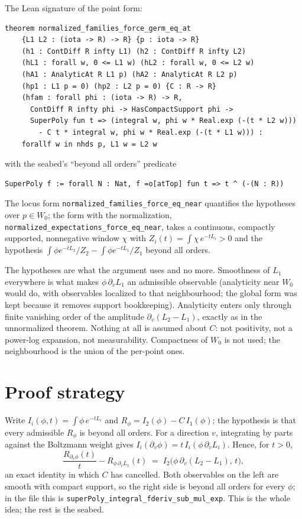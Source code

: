 \documentclass[11pt]{article}
\newcommand{\code}[1]{\texttt{#1}}
\begin{document}
\noindent The Lean signature of the point form:
\begin{verbatim}
theorem normalized_families_force_germ_eq_at
    {L1 L2 : (iota -> R) -> R} {p : iota -> R}
    (h1 : ContDiff R infty L1) (h2 : ContDiff R infty L2)
    (hL1 : forall w, 0 <= L1 w) (hL2 : forall w, 0 <= L2 w)
    (hA1 : AnalyticAt R L1 p) (hA2 : AnalyticAt R L2 p)
    (hp1 : L1 p = 0) (hp2 : L2 p = 0) {C : R -> R}
    (hfam : forall phi : (iota -> R) -> R,
      ContDiff R infty phi -> HasCompactSupport phi ->
      SuperPoly fun t => (integral w, phi w * Real.exp (-(t * L2 w)))
        - C t * integral w, phi w * Real.exp (-(t * L1 w))) :
    forallf w in nhds p, L1 w = L2 w
\end{verbatim}
with the seabed's ``beyond all orders'' predicate
\begin{verbatim}
SuperPoly f := forall N : Nat, f =o[atTop] fun t => t ^ (-(N : R))
\end{verbatim} The locus form
\code{normalized\_families\_force\_eq\_near} quantifies the hypotheses over
$p \in W_0$; the form with the normalization,
\code{normalized\_expectations\_force\_eq\_near}, takes a continuous,
compactly supported, nonnegative window $\chi$ with $Z_i(t) = \int\chi\,
e^{-tL_i} > 0$ and the hypothesis $\int\phi e^{-tL_2}/Z_2 -
\int\phi e^{-tL_1}/Z_1$ beyond all orders.

The hypotheses are what the argument uses and no more. Smoothness of
$L_1$ everywhere is what makes $\phi\,\partial_v L_1$ an admissible
observable (analyticity near $W_0$ would do, with observables localized
to that neighbourhood; the global form was kept because it removes
support bookkeeping). Analyticity enters only through finite vanishing
order of the amplitude $\partial_v(L_2 - L_1)$, exactly as in the
unnormalized theorem. Nothing at all is assumed about $C$: not
positivity, not a power-log expansion, not measurability. Compactness of
$W_0$ is not used; the neighbourhood is the union of the per-point ones.

\section{Proof strategy}

Write $I_i(\phi, t) = \int\phi\, e^{-tL_i}$ and $R_\phi = I_2(\phi) -
C\, I_1(\phi)$; the hypothesis is that every admissible $R_\phi$ is
beyond all orders. For a direction $v$, integrating by parts against the
Boltzmann weight gives $I_i(\partial_v\phi) = t\, I_i(\phi\, \partial_v
L_i)$. Hence, for $t > 0$,
\[
\frac{R_{\partial_v\phi}(t)}{t} - R_{\phi\,\partial_v L_1}(t)
\;=\; I_2\big(\phi\,\partial_v(L_2 - L_1),\, t\big) ,
\]
an exact identity in which $C$ has cancelled. Both observables on the
left are smooth with compact support, so the right side is beyond all
orders for every $\phi$; in the file this is
\code{superPoly\_integral\_fderiv\_sub\_mul\_exp}. This is the whole idea;
the rest is the seabed.
\end{document}
